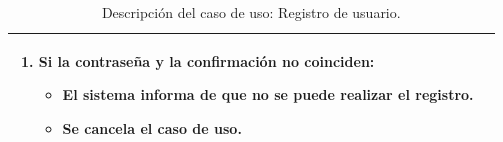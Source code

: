 \begin{table}[H]
\begin{center}
\begin{tabular}{|p{3.5cm}|p{10cm}|}
{\begin{enumerate}
\begin{itemize}
           \item Se cancela el caso de uso.
          \end{itemize}
	  \item Si la contraseña y la confirmación no coinciden:
	    \begin{itemize}
	      \item El sistema informa de que no se puede realizar el registro.
	      \item Se cancela el caso de uso.
	    \end{itemize}
         \end{enumerate}
         }\\
     \hline
    \end{tabular}
  \end{center}
\caption{Descripción del caso de uso: Registro de usuario.}
\end{table}




